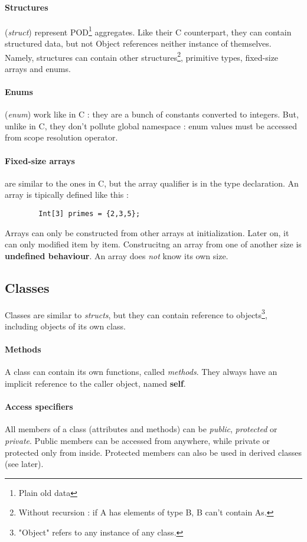 \documentclass[a4paper, 12pt]{article}
\begin{document}
	\paragraph{Structures}(\textit{struct}) represent POD\footnote{Plain old data} aggregates. Like their C counterpart, they can contain structured data, but not Object references neither instance of themselves. Namely, structures can contain other structures\footnote{Without recursion : if A has elements of type B, B can't contain As.}, primitive types, fixed-size arrays and enums.
	
	\paragraph{Enums}(\textit{enum}) work like in C : they are a bunch of constants converted to integers. But, unlike in C, they don't pollute global namespace : enum values must be accessed from scope resolution operator.
	
	\paragraph{Fixed-size arrays} are similar to the ones in C, but the array qualifier is in the type declaration. An array is tipically defined like this : 
	\begin{verbatim}
		Int[3] primes = {2,3,5};
	\end{verbatim}
	Arrays can only be constructed from other arrays at initialization. Later on, it can only modified item by item. Construcitng an array from one of another size is \textbf{undefined behaviour}.
	An array does \textit{not} know its own size.
	
	\subsection{Classes}
	Classes are similar to \textit{structs}, but they can contain reference to objects\footnote{"Object" refers to any instance of any class.}, including objects of its own class.
	\paragraph{Methods}
	A class can contain its own functions, called \textit{methods}. They always have an implicit reference to the caller object, named \textbf{self}.
	\paragraph{Access specifiers}
	All members of a class (attributes and methods) can be \textit{public}, \textit{protected} or \textit{private}. Public members can be accessed from anywhere, while private or protected only from inside. Protected members can also be used in derived classes (see later).
	
\end{document}

